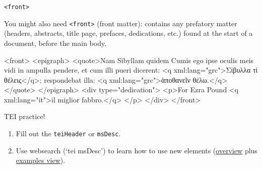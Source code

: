 \begin{frame}[fragile]{\texttt{<front>}}

You might also need \texttt{<front>} (front matter): contains any prefatory matter (headers, abstracts, title page, prefaces, dedications, etc.) found at the start of a document, before the main body. 

\begin{xmlcode}
<front>
 <epigraph>
  <quote>Nam Sibyllam quidem Cumis ego ipse oculis meis vidi in ampulla
     pendere, et cum illi pueri dicerent: <q xml:lang="grc">Σίβυλλα τί
       θέλεις</q>; respondebat illa: <q xml:lang="grc">ὰποθανεῖν θέλω.</q>
  </quote>
 </epigraph>
 <div type="dedication">
  <p>For Ezra Pound <q xml:lang="it">il miglior fabbro.</q>
  </p>
 </div>
</front>
\end{xmlcode}

\end{frame}

\begin{frame}[standout]
    \alert{TEI practice!} \\
    \begin{enumerate}\small
        \item Fill out the \texttt{teiHeader} or \texttt{msDesc}.
        \item Use websearch (`tei msDesc') to learn how to use new elements (\href{https://tei-c.org/release/doc/tei-p5-doc/en/html/ref-msDesc.html}{overview} plus \href{https://tei-c.org/release/doc/tei-p5-doc/en/html/examples-msDesc.html}{examples view}).
    \end{enumerate} 
\end{frame}




